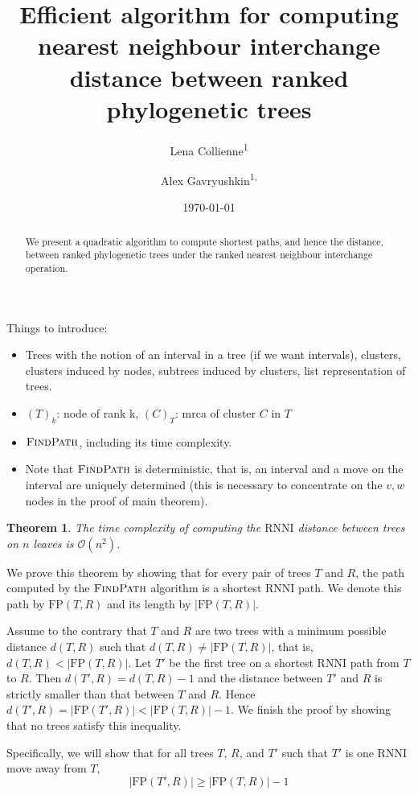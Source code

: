 \documentclass{amsart}
\title[Computing $\rnni$ distance]{Efficient algorithm for computing nearest neighbour interchange distance between ranked phylogenetic trees}
\date{\today}
\author{Lena Collienne\textsuperscript{1}}
\author{Alex Gavryushkin\textsuperscript{1, \Letter}}
\newtheorem{theorem}{Theorem}
\newcommand{\rnni}{\mathrm{RNNI}}
\newcommand{\findpath}{\textsc{FindPath}}
\newcommand{\fp}{\mathrm{FP}}
\renewcommand{\O}{\mathcal O}
\begin{document}
\begin{abstract}
We present a quadratic algorithm to compute shortest paths, and hence the distance, between ranked phylogenetic trees under the ranked nearest neighbour interchange operation.
\end{abstract}


\maketitle

Things to introduce:

\begin{itemize}
\item Trees with the notion of an interval in a tree (if we want intervals), clusters, clusters induced by nodes, subtrees induced by clusters, list representation of trees.
\item $(T)_k$: node of rank k, $(C)_T$: mrca of cluster $C$ in $T$
\item $\findpath$, including its time complexity.
\item Note that $\findpath$ is deterministic, that is, an interval and a move on the interval are uniquely determined (this is necessary to concentrate on the $v, w$ nodes in the proof of main theorem).
\end{itemize}

\begin{theorem}
The time complexity of computing the $\rnni$ distance between trees on $n$ leaves is $\O(n^2)$.
\end{theorem}

\proof
We prove this theorem by showing that for every pair of trees $T$ and $R$, the path computed by the $\findpath$ algorithm is a shortest $\rnni$ path.
We denote this path by $\fp(T, R)$ and its length by $|\fp(T, R)|$.

Assume to the contrary that $T$ and $R$ are two trees with a minimum possible distance $d(T, R)$ such that $d(T,R) \neq |\fp(T,R)|$, that is, $d(T,R) < |\fp(T,R)|$.
Let $T'$ be the first tree on a shortest $\rnni$ path from $T$ to $R$.
Then $d(T',R) = d(T, R) - 1$ and the distance between $T'$ and $R$ is strictly smaller than that between $T$ and $R$.
Hence $d(T', R) = |\fp(T',R)| < |\fp(T,R)| - 1$.
We finish the proof by showing that no trees satisfy this inequality.

Specifically, we will show that for all trees $T$, $R$, and $T'$ such that $T'$ is one $\rnni$ move away from $T$,
\begin{equation}
	|\fp(T',R)| \geq |\fp(T,R)| - 1
 	\label{eqn:iff_inequality}
\end{equation}
\end{document}
